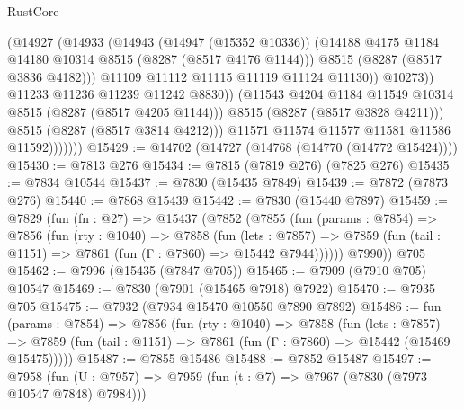 \begin{lexlean}{RustCore}
\begin{coremodule}
                              (@14927
                                (@14933
                                  (@14943
                                    (@14947 (@15352 @10336))
                                    (@14188
                                      @4175
                                      @1184
                                      @14180
                                      @10314
                                      @8515
                                      (@8287 (@8517 @4176 @1144)))
                                    @8515
                                    (@8287 (@8517 @3836 @4182)))
                                  @11109
                                  @11112
                                  @11115
                                  @11119
                                  @11124
                                  @11130))
                              @10273))
                          @11233
                          @11236
                          @11239
                          @11242
                          @8830))
                      (@11543 @4204 @1184 @11549 @10314 @8515 (@8287 (@8517 @4205 @1144)))
                      @8515
                      (@8287 (@8517 @3828 @4211)))
                    @8515
                    (@8287 (@8517 @3814 @4212)))
                  @11571
                  @11574
                  @11577
                  @11581
                  @11586
                  @11592)))))))
@15429 := @14702 (@14727 (@14768 (@14770 (@14772 @15424))))
@15430 := @7813 @276
@15434 := @7815 (@7819 @276) (@7825 @276)
@15435 := @7834 @10544
@15437 := @7830 (@15435 @7849)
@15439 := @7872 (@7873 @276)
@15440 := @7868 @15439
@15442 := @7830 (@15440 @7897)
@15459 := @7829
    (fun (fn : @27) =>
    @15437
      (@7852
        (@7855
          (fun (params : @7854) =>
          @7856
            (fun (rty : @1040) =>
            @7858
              (fun (lets : @7857) =>
              @7859 (fun (tail : @1151) => @7861 (fun (Γ : @7860) => @15442 @7944))))))
        @7990))
    @705
@15462 := @7996 (@15435 (@7847 @705))
@15465 := @7909 (@7910 @705) @10547
@15469 := @7830 (@7901 (@15465 @7918) @7922)
@15470 := @7935 @705
@15475 := @7932 (@7934 @15470 @10550 @7890 @7892)
@15486 := fun (params : @7854) =>
  @7856
    (fun (rty : @1040) =>
    @7858
      (fun (lets : @7857) =>
      @7859 (fun (tail : @1151) => @7861 (fun (Γ : @7860) => @15442 (@15469 @15475)))))
@15487 := @7855 @15486
@15488 := @7852 @15487
@15497 := @7958
    (fun (U : @7957) => @7959 (fun (t : @7) => @7967 (@7830 (@7973 @10547 @7848) @7984)))

\end{coremodule}
\end{lexlean}
